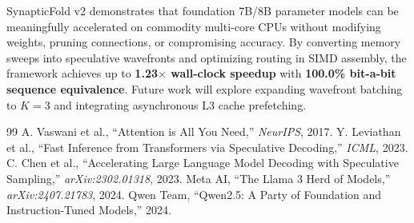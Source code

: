 \documentclass[journal,10pt,twocolumn]{article}
\theoremstyle{definition}
\begin{document}
SynapticFold v2 demonstrates that foundation 7B/8B parameter models can be meaningfully accelerated on commodity multi-core CPUs without modifying weights, pruning connections, or compromising accuracy. By converting memory sweeps into speculative wavefronts and optimizing routing in SIMD assembly, the framework achieves up to \textbf{1.23$\times$ wall-clock speedup} with \textbf{100.0\% bit-a-bit sequence equivalence}. Future work will explore expanding wavefront batching to $K=3$ and integrating asynchronous L3 cache prefetching.

\begin{thebibliography}{99}
 A. Vaswani et al., ``Attention is All You Need,'' \textit{NeurIPS}, 2017.
 Y. Leviathan et al., ``Fast Inference from Transformers via Speculative Decoding,'' \textit{ICML}, 2023.
 C. Chen et al., ``Accelerating Large Language Model Decoding with Speculative Sampling,'' \textit{arXiv:2302.01318}, 2023.
 Meta AI, ``The Llama 3 Herd of Models,'' \textit{arXiv:2407.21783}, 2024.
 Qwen Team, ``Qwen2.5: A Party of Foundation and Instruction-Tuned Models,'' 2024.
\end{thebibliography}
\end{document}
